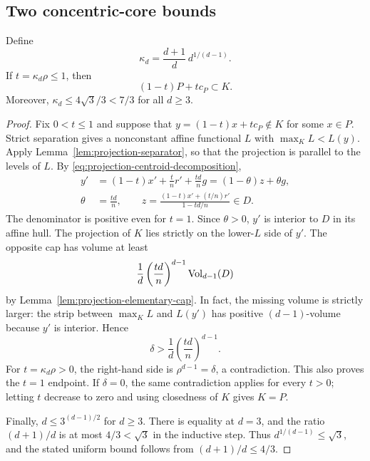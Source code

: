 \subsection{Two concentric-core bounds}

\begin{theorem}
\label{thm:projection-elementary-core}
Define
\[
 \kappa_d=\frac{d+1}{d}\,d^{1/(d-1)}.
\]
If $t=\kappa_d\rho\leq1$, then
\begin{equation}
 (1-t)P+t c_P\subset K.
 \label{eq:projection-elementary-core}
\end{equation}
Moreover,
$\kappa_d\leq4\sqrt3/3<7/3$ for all $d\geq3$.
\end{theorem}

\begin{proof}
Fix $0<t\leq1$ and suppose that
$y=(1-t)x+t c_P\notin K$ for some $x\in P$.  Strict separation gives
a nonconstant affine functional $L$ with
$\max_K L<L(y)$.  Apply Lemma~\ref{lem:projection-separator}, so
that the projection is parallel to the levels of $L$.  By
\eqref{eq:projection-centroid-decomposition},
\begin{align*}
 y'&=(1-t)x'+\frac t n r'+\frac{td}{n}g
     =(1-\theta)z+\theta g,\\
 \theta&=\frac{td}{n},\qquad
 z=\frac{(1-t)x'+(t/n)r'}{1-td/n}\in D.
\end{align*}
The denominator is positive even for $t=1$.  Since $\theta>0$,
$y'$ is interior to $D$ in its affine hull.  The projection of $K$
lies strictly on the lower-$L$ side of $y'$.  The opposite cap has
volume at least
\[
 \frac1d\left(\frac{td}{n}\right)^{d-1}\operatorname{Vol}_{d-1}(D)
\]
by Lemma~\ref{lem:projection-elementary-cap}.  In fact, the missing
volume is strictly larger: the strip between $\max_K L$ and $L(y')$
has positive $(d-1)$-volume because $y'$ is interior.  Hence
\begin{equation}
 \delta>\frac1d\left(\frac{td}{n}\right)^{d-1}.
 \label{eq:projection-elementary-contradiction}
\end{equation}
For $t=\kappa_d\rho>0$, the right-hand side is
$\rho^{d-1}=\delta$, a contradiction.  This also proves the
$t=1$ endpoint.  If $\delta=0$, the same contradiction applies for
every $t>0$; letting $t$ decrease to zero and using closedness of $K$
gives $K=P$.

Finally, $d\leq3^{(d-1)/2}$ for $d\geq3$.  There is equality at
$d=3$, and the ratio $(d+1)/d$ is at most $4/3<\sqrt3$ in the
inductive step.  Thus $d^{1/(d-1)}\leq\sqrt3$, and the stated
uniform bound follows from $(d+1)/d\leq4/3$.
\end{proof}

